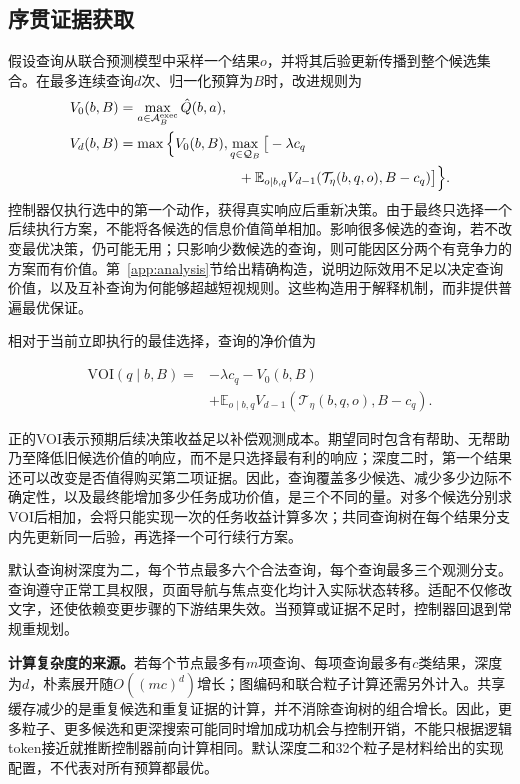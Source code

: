 \documentclass[sigconf,anonymous,review]{acmart}
\newcommand{\E}{\mathbb{E}}
\theoremstyle{zhplain}
\begin{document}
\subsection{序贯证据获取}
假设查询从联合预测模型中采样一个结果\(o\)，并将其后验更新传播到整个候选集合。在最多连续查询\(d\)次、归一化预算为\(B\)时，改进规则为
\begin{equation}
\begin{aligned}
V_0(b,B)&=\max_{a\in\mathcal A_B^{\mathrm{exec}}}\hat Q(b,a),\\
V_d(b,B)&=\max\Big\{V_0(b,B),\max_{q\in\mathcal Q_B}\big[-\lambda c_q\\
&\hspace{30mm}+\E_{o\mid b,q}V_{d-1}(\mathcal T_\eta(b,q,o),B-c_q)\big]\Big\}.
\end{aligned}
\label{eq:tree}
\end{equation}
控制器仅执行选中的第一个动作，获得真实响应后重新决策。由于最终只选择一个后续执行方案，不能将各候选的信息价值简单相加。影响很多候选的查询，若不改变最优决策，仍可能无用；只影响少数候选的查询，则可能因区分两个有竞争力的方案而有价值。第~\ref{app:analysis}节给出精确构造，说明边际效用不足以决定查询价值，以及互补查询为何能够超越短视规则。这些构造用于解释机制，而非提供普遍最优保证。

相对于当前立即执行的最佳选择，查询的净价值为

\begin{equation}
\begin{aligned}
\mathrm{VOI}(q\mid b,B)={}&-\lambda c_q-V_0(b,B)\\
&+\E_{o\mid b,q}V_{d-1}(\mathcal T_\eta(b,q,o),B-c_q).
\end{aligned}
\label{eq:voi}
\end{equation}

正的VOI表示预期后续决策收益足以补偿观测成本。期望同时包含有帮助、无帮助乃至降低旧候选价值的响应，而不是只选择最有利的响应；深度二时，第一个结果还可以改变是否值得购买第二项证据。因此，查询覆盖多少候选、减少多少边际不确定性，以及最终能增加多少任务成功价值，是三个不同的量。对多个候选分别求VOI后相加，会将只能实现一次的任务收益计算多次；共同查询树在每个结果分支内先更新同一后验，再选择一个可行续行方案。

默认查询树深度为二，每个节点最多六个合法查询，每个查询最多三个观测分支。查询遵守正常工具权限，页面导航与焦点变化均计入实际状态转移。适配不仅修改文字，还使依赖变更步骤的下游结果失效。当预算或证据不足时，控制器回退到常规重规划。

\textbf{计算复杂度的来源。}若每个节点最多有\(m\)项查询、每项查询最多有\(c\)类结果，深度为\(d\)，朴素展开随\(O((mc)^d)\)增长；图编码和联合粒子计算还需另外计入。共享缓存减少的是重复候选和重复证据的计算，并不消除查询树的组合增长。因此，更多粒子、更多候选和更深搜索可能同时增加成功机会与控制开销，不能只根据逻辑token接近就推断控制器前向计算相同。默认深度二和32个粒子是材料给出的实现配置，不代表对所有预算都最优。
\end{document}
